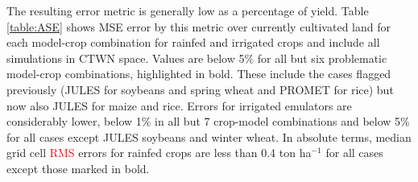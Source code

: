 \documentclass[gmd, manuscript]{copernicus} %
\begin{document}
The resulting error metric is generally low as a percentage of yield.
Table \ref{table:ASE} shows MSE error by this metric over currently cultivated land for each model-crop combination for rainfed and irrigated crops and include all simulations in CTWN space. 
Values are below 5\% for all but six problematic model-crop combinations, highlighted in bold. 
These include the cases flagged previously (JULES for soybeans and spring wheat and PROMET for rice) but now also JULES for maize and rice.
Errors for irrigated emulators are considerably lower, below 1\% in all but 7 crop-model combinations and below 5\% for all cases except JULES soybeans and winter wheat.
In absolute terms, median grid cell \textcolor{red}{RMS} errors for rainfed crops are less than 0.4 ton ha$^{-1}$ for all cases except those marked in bold. %
\end{document}
